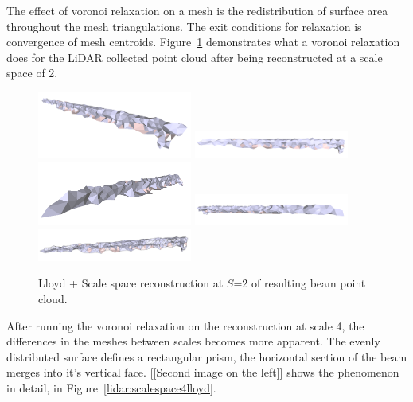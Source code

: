 \documentclass[12pt]{drexelthesis}
\begin{document}
The effect of voronoi relaxation on a mesh is the redistribution of surface area throughout the mesh triangulations. The exit conditions for relaxation is convergence of mesh centroids. Figure~\ref{lidar:scalespace2lloyd} demonstrates what a voronoi relaxation does for the LiDAR collected point cloud after being reconstructed at a scale space of 2.

\begin{figure}[!ht]
	\centering
		\includegraphics[width=2in]{real-lab-scans/meshed/optimized/scalespace2lloyd00.png}
		\includegraphics[width=2in]{real-lab-scans/meshed/optimized/scalespace2lloyd01.png}
		\includegraphics[width=2in]{real-lab-scans/meshed/optimized/scalespace2lloyd02.png}
		\includegraphics[width=2in]{real-lab-scans/meshed/optimized/scalespace2lloyd03.png}
		\includegraphics[width=2in]{real-lab-scans/meshed/optimized/scalespace2lloyd04.png}
		\caption[Lloyd + Scale space reconstruction at $S$=2 of segmented LiDAR data]{\centering Lloyd + Scale space reconstruction at $S$=2 of resulting beam point cloud.}
	\label{lidar:scalespace2lloyd}
\end{figure}

After running the voronoi relaxation on the reconstruction at scale 4, the differences in the meshes between scales becomes more apparent. The evenly distributed surface defines a rectangular prism, the horizontal section of the beam merges into it's vertical face. [[Second image on the left]] shows the phenomenon in detail, in Figure~\ref{lidar:scalespace4lloyd}.
\end{document}
